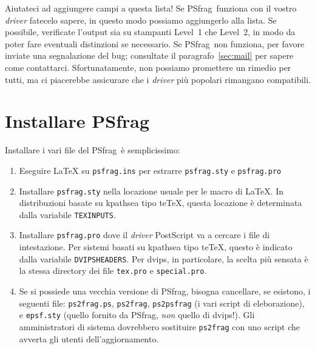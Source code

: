 \documentclass[a4paper,11pt]{ltxguide}
\let\pkg\textsf
\let\fname\texttt
\newcommand{\pfg}{\pkg{PSfrag}}
\begin{document}
Aiutateci ad aggiungere campi a questa lista! Se  \pfg\ funziona
con il vostro \emph{driver} fatecelo sapere, in questo modo possiamo aggiungerlo alla
lista. Se possibile, verificate l'output %
sia su stampanti Level~1 che Level~2, in modo da poter fare eventuali
distinzioni se necessario. Se \pfg\ non funziona, per favore inviate una
segnalazione del bug; consultate il paragrafo~\ref{sec:mail} per sapere
come contattarci. Sfortunatamente, non possiamo promettere un rimedio
per tutti, ma ci piacerebbe assicurare che i \emph{driver} pi\`u popolari
rimangano compatibili.

\section{Installare \pfg}

Installare i vari file del \pfg\ \`e semplicissimo:
\begin{enumerate}
\item Eseguire \LaTeX{} su \fname{psfrag.ins} per estrarre
  \fname{psfrag.sty} e \fname{psfrag.pro}
\item Installare \fname{psfrag.sty} nella locazione usuale
  per le macro di \LaTeX{}. In distribuzioni basate su \pkg{kpathsea}
  tipo \pkg{te\TeX}, questa locazione \`e determinata dalla variabile
  \texttt{TEXINPUTS}.
\item Installare \fname{psfrag.pro} dove il \emph{driver} PostScript va a 
  cercare i file di intestazione. Per sistemi basati su \pkg{kpathsea} tipo 
  \pkg{te\TeX}, questo \`e indicato dalla variabile \texttt{DVIPSHEADERS}.
  Per  \pkg{dvips}, in particolare, la scelta pi\`u sensata \`e la 
  stessa directory dei file \fname{tex.pro} e \fname{special.pro}.
\item Se si possiede una vecchia versione di \pfg, bisogna cancellare,
        se esistono, i seguenti file: \fname{ps2frag.ps}, \fname{ps2frag},
   \fname{ps2psfrag} (i vari script di eleborazione), e \fname{epsf.sty}
  (quello fornito da \pfg{}, \emph{non} quello di \pkg{dvips}!). 
  Gli amministratori di sistema dovrebbero sostituire \fname{ps2frag}
  con uno script che avverta gli  utenti dell'aggiornamento.
\end{enumerate}
\end{document}
